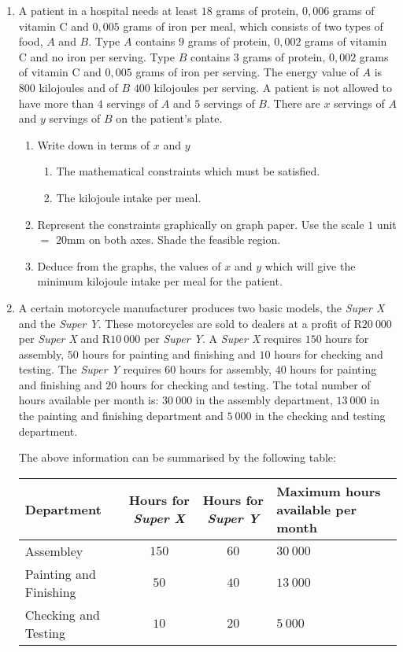\begin{enumerate}
\item{A patient in a hospital needs at least $18$ grams of protein, $0,006$ grams of vitamin C and $0,005$ grams of iron per meal, which consists of two types of food, $A$ and $B$. Type $A$ contains $9$ grams of protein, $0,002$ grams of vitamin C and no iron per serving. Type $B$ contains $3$ grams of protein, $0,002$ grams of vitamin C and $0,005$ grams of iron per serving. The energy value of $A$ is $800$ kilojoules and of $B$ $400$ kilojoules per serving. A patient is not allowed to have more than $4$ servings of $A$ and $5$ servings of $B$. There are $x$ servings of $A$ and $y$ servings of $B$ on the patient's plate.
\begin{enumerate}
\item{Write down in terms of $x$ and $y$}
\begin{enumerate}
\item{The mathematical constraints which must be satisfied.}
\item{The kilojoule intake per meal.}
\end{enumerate}
\item{Represent the constraints graphically on graph paper. Use the scale $1$ unit $=$ $20$mm on both axes. Shade the feasible region.}
\item{Deduce from the graphs, the values of $x$ and $y$ which will give the minimum kilojoule intake per meal for the patient.}
\end{enumerate}}
\item{A certain motorcycle manufacturer produces two basic models, the \textit{Super X} and the \textit{Super Y}. These motorcycles are sold to dealers at a profit of R$20~000$ per \textit{Super X} and R$10~000$ per \textit{Super Y}. A \textit{Super X} requires $150$ hours for assembly, $50$ hours for painting and finishing and $10$ hours for checking and testing. The \textit{Super Y} requires $60$ hours for assembly, $40$ hours for painting and finishing and $20$ hours for checking and testing. The total number of hours available per month is: $30~000$ in the assembly department, $13~000$ in the painting and finishing department and $5~000$ in the checking and testing department.

The above information can be summarised by the following table:

\begin{center}
\begin{tabular}{|l|c|c|p{3cm}|}\hline
Department& Hours for \textit{Super X}&Hours for \textit{Super Y}& Maximum hours available per month\\\hline\hline
Assembley&$150$&$60$&$30~ 000$\\\hline
Painting and Finishing & $50$& $40$ &$13~ 000$\\\hline
Checking and Testing &$10$&$20$&$5~ 000$\\\hline
\end{tabular}
\end{center}

}
\end{enumerate}

